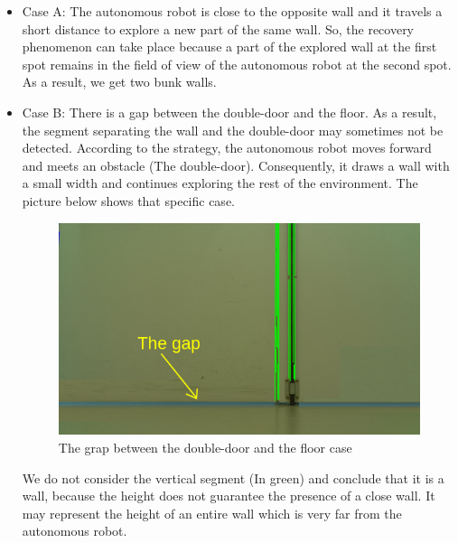\documentclass[12pt]{report}
\begin{document}
	\begin{itemize}
		\item Case A: The autonomous robot is close to the opposite wall and it travels a short distance to explore a new part of the same wall. So, the recovery phenomenon can take place because a part of the explored wall at the first spot remains in the field of view of the autonomous robot at the second spot. As a result, we get two bunk walls.
		\item Case B: There is a gap between the double-door and the floor. As a result, the segment separating the wall and the double-door may sometimes not be detected. According to the strategy, the autonomous robot moves forward and meets an obstacle (The double-door). Consequently, it draws a wall with a small width and continues exploring the rest of the environment. The picture below shows that specific case.

			\begin{figure}[H]
			\begin{center}
				\includegraphics[scale=0.50]{res/no_segment.png}
				\caption{The grap between the double-door and the floor case}
			\end{center}
			\end{figure}
		We do not consider the vertical segment (In green)  and conclude that it is a wall, because the height does not guarantee the presence of a close wall. It may represent the height of an entire wall which is very far from the autonomous robot.
		

\end{itemize}
\end{document}
